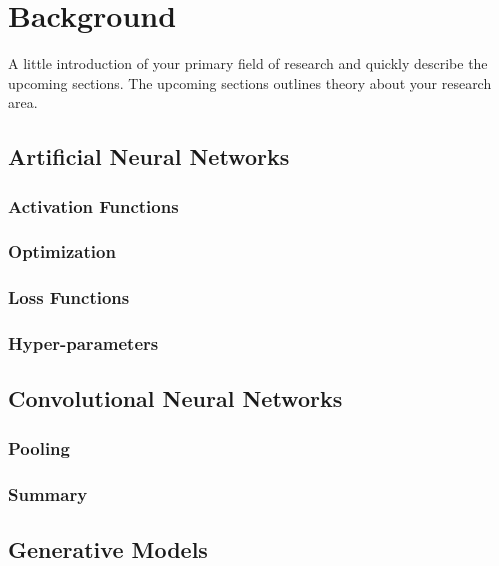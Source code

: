 \documentclass{uia}
\begin{document}
\chapter{Background}
\label{chap:bg}
A little introduction of your primary field of research and quickly describe the upcoming sections.
The upcoming sections outlines theory about your research area.

\section{Artificial Neural Networks}
\label{sec:bg:ann}


\subsection{Activation Functions}
\label{sec:bg:ann:activation}

\subsection{Optimization}
\label{sec:bg:ann:optimization}

\subsection{Loss Functions}
\label{sec:bg:ann:loss_functions}

\subsection{Hyper-parameters}
\label{sec:bg:ann:hyper_parameters}


\section{Convolutional Neural Networks}
\label{sec:bg:convnet}

\subsection{Pooling}
\label{sec:bg:convnet:pooling}

\subsection{Summary}
\label{sec:bg:convnet:summary}

\section{Generative Models}
\label{sec:bg:generative_models}
\end{document}
